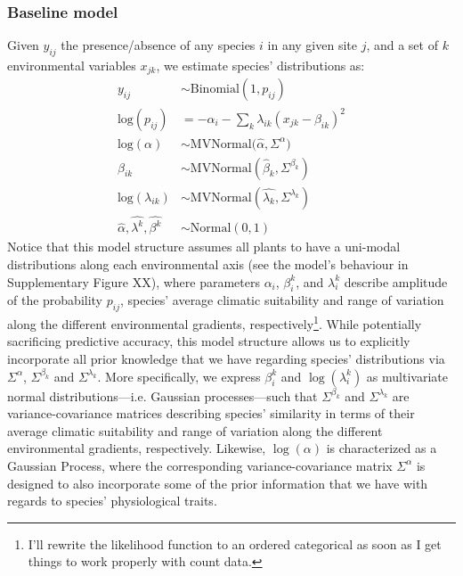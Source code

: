 \documentclass[11pt, a4paper]{article}
\begin{document}
\subsubsection*{Baseline model}
Given $y_{ij}$ the presence/absence of any species $i$ in any given site $j$, and a set of $k$ environmental variables $x_{jk}$, we estimate species' distributions as:
\begin{equation} 
\begin{split}
y_{ij} & \sim \text{Binomial}\left(1, p_{ij}\right)\\
\text{log}\left(p_{ij}\right) & = -\alpha_{i} - \sum_{k} \lambda_{ik} \left(x_{jk}-\beta_{ik}\right)^2\\
\text{log}(\alpha)  & \sim \text{MVNormal}\Big(\hat{\alpha}, \Sigma^{\alpha}\Big)\\
\beta_{ik}  & \sim \text{MVNormal}\left(\hat{\beta}_{k}, \Sigma^{\beta_{k}}\right)\\
\text{log}(\lambda_{ik})  & \sim \text{MVNormal}\left(\hat{\lambda_{k}}, \Sigma^{\lambda_{k}}\right)\\
\hat{\alpha}, 
\hat{\lambda^{k}}, 
\hat{\beta^{k}}  & \sim \text{Normal}\left(0,1\right)
\end{split}
\label{eq:baseline}
\end{equation}
Notice that this model structure assumes all plants to have a uni-modal distributions along each environmental axis (see the model's behaviour in Supplementary Figure XX), where parameters $\alpha_i$, $\beta_i^k$, and $\lambda_i^k$ describe amplitude of the probability $p_{ij}$, species' average climatic suitability and range of variation along the different environmental gradients, respectively\footnote[2]{I'll rewrite the likelihood function to an ordered categorical as soon as I get things to work properly with count data.}. While potentially sacrificing predictive accuracy, this model structure allows us to explicitly incorporate all prior knowledge that we have regarding species' distributions via $\Sigma^{\alpha}$, $\Sigma^{\beta_{k}}$ and $\Sigma^{\lambda_{k}}$. More specifically, we express $\beta_i^k$ and $\log\left(\lambda_i^k\right)$ as multivariate normal distributions---i.e. Gaussian processes---such that $\Sigma^{\beta_{k}}$ and $\Sigma^{\lambda_{k}}$ are variance-covariance matrices describing species' similarity in terms of their average climatic suitability and range of variation along the different environmental gradients, respectively. Likewise, $\log\left(\alpha\right)$ is characterized as a Gaussian Process, where the corresponding variance-covariance matrix $\Sigma^{\alpha}$ is designed to also incorporate some of the prior information that we have with regards to species' physiological traits.
\end{document}

